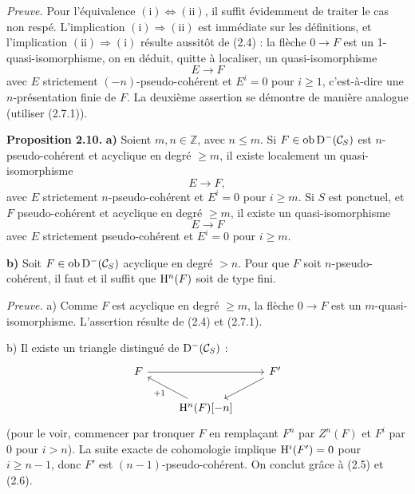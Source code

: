 \documentclass[11pt]{article}
\newcommand{\Spec}{\operatorname{Spec}}
\begin{document}
\emph{Preuve.} Pour l'équivalence \((\mathrm{i})\Leftrightarrow(\mathrm{ii})\), il suffit évidemment de traiter le cas non respé. L'implication \((\mathrm{i})\Rightarrow(\mathrm{ii})\) est immédiate sur les définitions, et l'implication \((\mathrm{ii})\Rightarrow(\mathrm{i})\) résulte aussitôt de (2.4) : la flèche \(0\to F\) est un 1-quasi-isomorphisme, on en déduit, quitte à localiser, un quasi-isomorphisme
\[
  E\longrightarrow F
\]
avec \(E\) strictement \((-n)\)-pseudo-cohérent et \(E^i=0\) pour \(i\geq 1\), c'est-à-dire une \(n\)-présentation finie de \(F\). La deuxième assertion se démontre de manière analogue (utiliser (2.7.1)).

\textbf{Proposition 2.10.} \textbf{a)} Soient \(m,n\in\mathbb Z\), avec \(n\leq m\). Si \(F\in\operatorname{ob}\mathrm D^-(\mathcal C_S)\) est \(n\)-pseudo-cohérent et acyclique en degré \(\geq m\), il existe localement un quasi-isomorphisme
\[
  E\longrightarrow F,
\]
avec \(E\) strictement \(n\)-pseudo-cohérent et \(E^i=0\) pour \(i\geq m\). Si \(S\) est ponctuel, et \(F\) pseudo-cohérent et acyclique en degré \(\geq m\), il existe un quasi-isomorphisme
\[
  E\longrightarrow F
\]
avec \(E\) strictement pseudo-cohérent et \(E^i=0\) pour \(i\geq m\).

\textbf{b)} Soit \(F\in\operatorname{ob}\mathrm D^-(\mathcal C_S)\) acyclique en degré \(>n\). Pour que \(F\) soit \(n\)-pseudo-cohérent, il faut et il suffit que \(\mathrm H^n(F)\) soit de type fini.

\emph{Preuve.} a) Comme \(F\) est acyclique en degré \(\geq m\), la flèche \(0\to F\) est un \(m\)-quasi-isomorphisme. L'assertion résulte de (2.4) et (2.7.1).

b) Il existe un triangle distingué de \(\mathrm D^-(\mathcal C_S)\) :
\[
\begin{tikzcd}
F \arrow[rr] && F' \arrow[dl]\\
& \Ho^n(F)[-n] \arrow[ul,"+1"] &
\end{tikzcd}
\]
(pour le voir, commencer par tronquer \(F\) en remplaçant \(F^n\) par \(Z^n(F)\) et \(F^i\) par \(0\) pour \(i>n\)). La suite exacte de cohomologie implique \(\mathrm H^i(F')=0\) pour \(i\geq n-1\), donc \(F'\) est \((n-1)\)-pseudo-cohérent. On conclut grâce à (2.5) et (2.6).



\providecommand{\RHom}{\mathrm R\!\Hom}
\providecommand{\Ext}{\operatorname{Ext}}
\providecommand{\coh}{\operatorname{coh}}
\providecommand{\PreCoh}{\operatorname{precoh}}
\providecommand{\Tr}{\operatorname{Tr}}
\providecommand{\Qis}{\operatorname{Qis}}
\providecommand{\Rad}{\operatorname{rad}}
\providecommand{\Spec}{\operatorname{Spec}}
\providecommand{\End}{\operatorname{End}}
\providecommand{\Id}{\operatorname{Id}}
\providecommand{\limdir}{\mathop{\mathrm{lim}}\limits_{\longrightarrow}}
\providecommand{\liminv}{\mathop{\mathrm{lim}}\limits_{\longleftarrow}}
\providecommand{\qcoh}{\operatorname{qcoh}}
\providecommand{\amp}{\operatorname{amp}}
\end{document}
